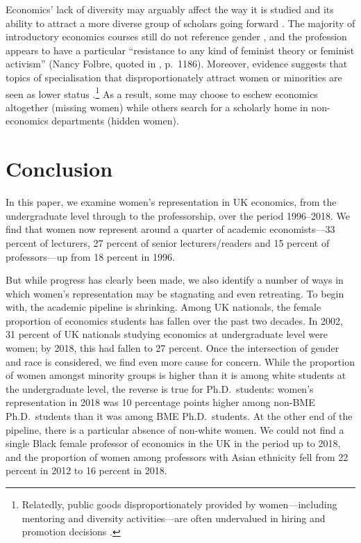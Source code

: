 \documentclass[a4paper, 1]{article}
\begin{document}
Economics' lack of diversity may arguably affect the way it is studied and its ability to attract a more diverse group of scholars going forward \citep{Bateman2019}. The majority of introductory economics courses still do not reference gender \citep{Asarta2020}, and the profession appears to have a particular ``resistance to any kind of feminist theory or feminist activism'' (Nancy Folbre, quoted in \citet{OrozcoEspinel2022}, p.~1186). Moreover, evidence suggests that topics of specialisation that disproportionately attract women or minorities are seen as lower status \citep{Key2019, Fortin2021, Zacchia2021}.\footnote{Relatedly, public goods disproportionately provided by women---including mentoring and diversity activities---are often undervalued in hiring and promotion decisions \citep[see, \emph{e.g.},][]{Jacobsen2006a}.} As a result, some may choose to eschew economics altogether (missing women) while others search for a scholarly home in non-economics departments (hidden women).

\hypertarget{sec:conclusion}{%
\section{Conclusion}\label{sec:conclusion}}

In this paper, we examine women's representation in UK economics, from the undergraduate level through to the professorship, over the period 1996--2018. We find that women now represent around a quarter of academic economists---33 percent of lecturers, 27 percent of senior lecturers/readers and 15 percent of professors---up from 18 percent in 1996.

But while progress has clearly been made, we also identify a number of ways in which women's representation may be stagnating and even retreating. To begin with, the academic pipeline is shrinking. Among UK nationals, the female proportion of economics students has fallen over the past two decades. In 2002, 31 percent of UK nationals studying economics at undergraduate level were women; by 2018, this had fallen to 27 percent. Once the intersection of gender and race is considered, we find even more cause for concern. While the proportion of women amongst minority groups is higher than it is among white students at the undergraduate level, the reverse is true for Ph.D.~students: women's representation in 2018 was 10 percentage points higher among non-BME Ph.D.~students than it was among BME Ph.D.~students. At the other end of the pipeline, there is a particular absence of non-white women. We could not find a single Black female professor of economics in the UK in the period up to 2018, and the proportion of women among professors with Asian ethnicity fell from 22 percent in 2012 to 16 percent in 2018.
\end{document}
